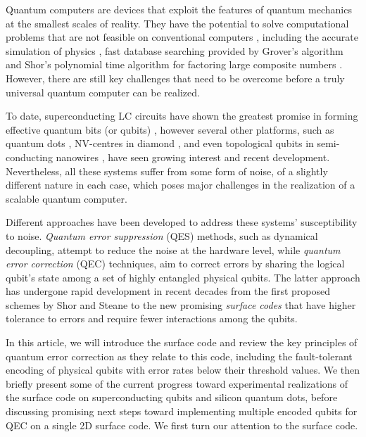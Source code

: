 Quantum computers are devices that exploit the features of quantum mechanics at
the smallest scales of reality. They have the potential to solve computational
problems that are not feasible on conventional computers
\cite{nielsen_chuang_2010}, including the accurate simulation of physics
\cite{feynman82_simul_physic_with_comput}, fast database searching provided by
Grover's algorithm \cite{Grover_1996} and Shor's polynomial time algorithm for
factoring large composite numbers \cite{Shor_1997}. However, there are still key
challenges that need to be overcome before a truly universal quantum computer
can be realized.


To date, superconducting LC circuits have shown the greatest promise in forming
effective quantum bits (or qubits)
\cite{Rol_2019, barends14_super_quant_circuit_at_surfac}, however several other
platforms, such as quantum dots \cite{huang19_fidel_bench_two_qubit_gates_silic}
\cite{Lawrie_2020}, NV-centres in diamond \cite{Taminiau_2014}, and even
topological qubits in semi-conducting nanowires \cite{Mourik_2012}, have seen
growing interest and recent development. Nevertheless, all these systems suffer
from some form of noise, of a slightly different nature in each case, which
poses major challenges in the realization of a scalable quantum computer.

Different approaches have been developed to address these systems'
susceptibility to noise. \textit{Quantum error suppression} (QES) methods, such
as dynamical decoupling, attempt to reduce the noise at the hardware level,
while \textit{quantum error correction} (QEC) techniques, aim to correct errors
by sharing the logical qubit's state among a set of highly entangled
physical qubits. The latter approach has undergone rapid development in recent
decades from the first proposed schemes by Shor \cite{Shor_1995_QEC} and Steane
\cite{Steane_1996_QEC} to the new promising \textit{surface codes}
\cite{fowler12_surfac_codes} that have higher tolerance to errors and require
fewer interactions among the qubits.

In this article, we will introduce the surface code and review the key
principles of quantum error correction as they relate to this code, including
the fault-tolerant encoding of physical qubits with error rates below their
threshold values. We then briefly present some of the current progress toward
experimental realizations of the surface code on superconducting qubits and
silicon quantum dots, before discussing promising next steps toward implementing
multiple encoded qubits for QEC on a single 2D surface code. We first turn our
attention to the surface code.

